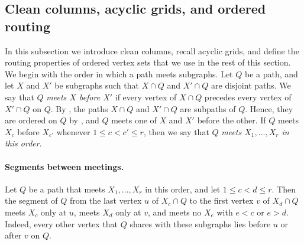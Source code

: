 \documentclass[fontsize=12pt,leading=14pt]{fullpaper}
\begin{document}
\subsection{Clean columns, acyclic grids, and ordered routing}\label{sec:s3-grids}

In this subsection we introduce clean columns, recall acyclic grids, and define the routing properties of ordered vertex sets that we use in the rest of this section.
We begin with the order in which a path meets subgraphs.
Let $Q$ be a path, and let $X$ and $X'$ be subgraphs such that $X\cap Q$ and $X'\cap Q$ are disjoint paths.
We say that $Q$ \emph{meets $X$ before $X'$} if every vertex of $X\cap Q$ precedes every vertex of $X'\cap Q$ on $Q$.
By , the paths $X\cap Q$ and $X'\cap Q$ are subpaths of $Q$.
Hence, they are ordered on $Q$ by , and $Q$ meets one of $X$ and $X'$ before the other.
If $Q$ meets $X_c$ before $X_{c'}$ whenever $1\le c<c'\le r$, then we say that $Q$ \emph{meets $X_1,\dots,X_r$ in this order}.

\paragraph{Segments between meetings.}\label{par:s3-between}
Let $Q$ be a path that meets $X_1,\dots,X_r$ in this order, and let $1\le c<d\le r$.
Then the segment of $Q$ from the last vertex $u$ of $X_c\cap Q$ to the first vertex $v$ of $X_d\cap Q$ meets $X_c$ only at $u$, meets $X_d$ only at $v$, and meets no $X_e$ with $e<c$ or $e>d$.
Indeed, every other vertex that $Q$ shares with these subgraphs lies before $u$ or after $v$ on $Q$.
\end{document}
